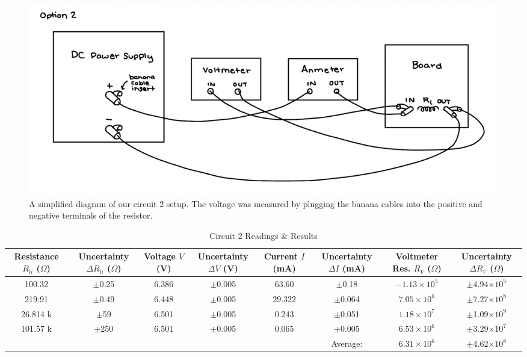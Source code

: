 \documentclass{article} %
\begin{document}
\begin{figure}[htbp]            %
  \centering
  \includegraphics[width=0.9\linewidth]{Figs/Cct_2_Diagram.png}
  \caption{A simplified diagram of our circuit 2 setup.
            The voltage was measured by plugging the banana cables into the positive and negative terminals of the resistor.}
  \label{fig:Cct_2_Diagram}
\end{figure}

\begin{table}[htbp]
\centering
\caption{Circuit 2 Readings \& Results}
\begin{tabular}{|c|c|c|c|c|c|c|c|}
\hline
\makecell{Resistance \\ $R_{li}$ ($\Omega$)} & \makecell{Uncertainty \\ $\Delta R_{li}$ ($\Omega$)} & \makecell{Voltage \\ $V$ (V)} & \makecell{Uncertainty \\ $\Delta V$ (V)} & \makecell{Current \\ $I$ (mA)} & \makecell{Uncertainty \\ $\Delta I$ (mA)} & \makecell{Voltmeter Res. \\ $R_V$ ($\Omega$)} & \makecell{Uncertainty \\ $\Delta R_V$ ($\Omega$)} \\
\hline
100.32 & $\pm$0.25 & 6.386 & $\pm$0.005 & 63.60 & $\pm$0.18 & $-1.13 \times 10^5$ & $\pm$4.94$\times 10^5$ \\
\hline
219.91 & $\pm$0.49 & 6.448 & $\pm$0.005 & 29.322 & $\pm$0.064 & $7.05 \times 10^6$ & $\pm$7.27$\times 10^8$ \\
\hline
26.814 k & $\pm$59 & 6.501 & $\pm$0.005 & 0.243 & $\pm$0.051 & $1.18 \times 10^7$ & $\pm$1.09$\times 10^9$ \\
\hline
101.57 k & $\pm$250 & 6.501 & $\pm$0.005 & 0.065 & $\pm$0.005 & $6.53 \times 10^6$ & $\pm$3.29$\times 10^7$ \\
\hline
\cellcolor{gray!50} & \cellcolor{gray!50} & \cellcolor{gray!50} & \cellcolor{gray!50} & \cellcolor{gray!50} & Average: & $6.31 \times 10^6$ & $\pm$4.62$\times 10^8$ \\
\hline
\end{tabular}
\end{table}
\end{document}
